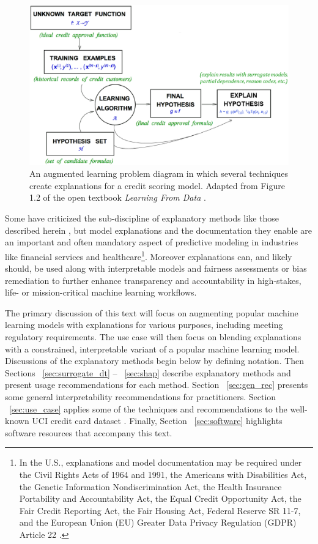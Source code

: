 \documentclass[sigconf, review]{acmart}
\begin{document}
\begin{figure}[htb]

	\begin{center}
		\includegraphics[scale=0.30]{img/figure_1.eps}
		\caption{An augmented learning problem diagram in which several techniques create explanations for a credit scoring model. Adapted from Figure 1.2 of the open textbook \textit{Learning From Data} \cite{lfd}.}
		\label{fig:learning_problem}
	\end{center}
\end{figure}

Some have criticized the sub-discipline of explanatory methods like those described herein \cite{please_stop}, but model explanations and the documentation they enable are an important and often mandatory aspect of predictive modeling in industries like financial services and healthcare\footnote{In the U.S., explanations and model documentation may be required under the Civil Rights Acts of 1964 and 1991, the Americans with Disabilities Act, the Genetic Information Nondiscrimination Act, the Health Insurance Portability and Accountability Act, the Equal Credit Opportunity Act, the Fair Credit Reporting Act, the Fair Housing Act, Federal Reserve SR 11-7, and the European Union (EU) Greater Data Privacy Regulation (GDPR) Article 22 \cite{ff_interpretability}.}. Moreover explanations can, and likely should, be used along with interpretable models and fairness assessments or bias remediation to further enhance transparency and accountability in high-stakes, life- or mission-critical machine learning workflows.   

The primary discussion of this text will focus on augmenting popular machine learning models with explanations for various purposes, including meeting regulatory requirements. The use case will then focus on blending explanations with a constrained, interpretable variant of a popular machine learning model. Discussions of the explanatory methods begin below by defining notation. Then Sections ~\ref{sec:surrogate_dt} -- ~\ref{sec:shap} describe explanatory methods and present usage recommendations for each method. Section ~\ref{sec:gen_rec} presents some general interpretability recommendations for practitioners. Section ~\ref{sec:use_case} applies some of the techniques and recommendations to the well-known UCI credit card dataset \cite{uci}. Finally, Section ~\ref{sec:software} highlights software resources that accompany this text. 
\end{document}
